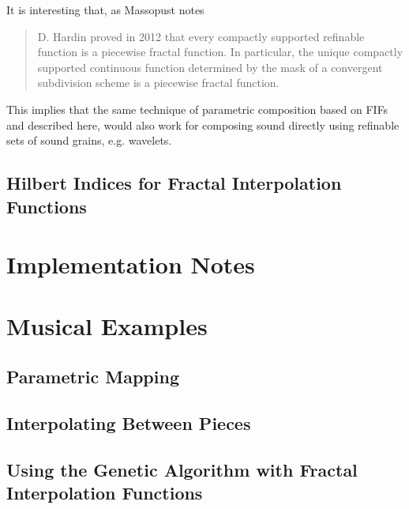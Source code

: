 \documentclass[english,11pt,letterpaper,onecolumn]{scrartcl}
\begin{document}
It is interesting that, as Massopust notes \cite{massopust2017} 
\begin{quote}D. Hardin proved in 2012 that every compactly supported 
refinable function is a piecewise fractal function. In particular, the unique 
compactly supported continuous function determined by the mask of a convergent 
subdivision scheme is a piecewise fractal function. \end{quote} 
This implies that the same technique of parametric 
composition based on FIFs and described here, would also work for composing 
sound directly using refinable sets of sound grains, e.g. wavelets.

\subsection{Hilbert Indices for Fractal Interpolation Functions}

\section{Implementation Notes}

\section{Musical Examples}

\subsection{Parametric Mapping}


\subsection{Interpolating Between Pieces}


\subsection{Using the Genetic Algorithm with Fractal Interpolation Functions}



{}
\end{document}
